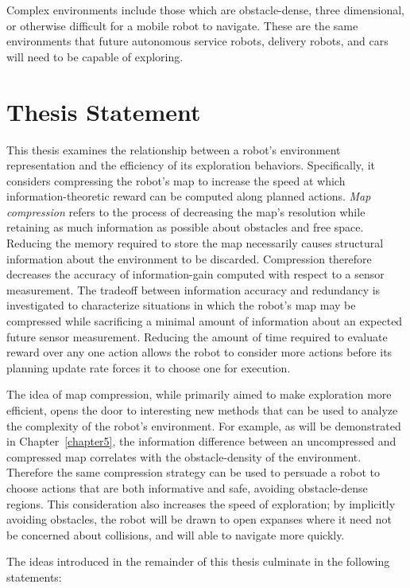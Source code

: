 Complex environments include those which are obstacle-dense, three dimensional, or
otherwise difficult for a mobile robot to navigate. These are the same
environments that future autonomous service robots, delivery robots, and cars
will need to be capable of exploring.

\section{Thesis Statement}

This thesis examines the relationship between a robot's environment
representation and the efficiency of its exploration behaviors.
Specifically, it considers compressing the robot's map to
increase the speed at which information-theoretic reward can be computed along
planned actions. \textit{Map compression} refers to the process of
decreasing the map's resolution while retaining as much information as
possible about obstacles and free space. Reducing the memory required to
store the map necessarily causes structural information about the environment to
be discarded. Compression therefore decreases the accuracy of information-gain
computed with respect to a sensor measurement. The tradeoff between information accuracy and
redundancy is investigated to characterize situations in which the robot's map may be
compressed while sacrificing a minimal amount of information about an expected
future sensor measurement. Reducing the amount of time required to evaluate
reward over any one action allows the robot to consider more actions before
its planning update rate forces it to choose one for execution.

The idea of map compression, while primarily aimed to make exploration more
efficient, opens the door to interesting new methods that can
be used to analyze the complexity of the robot's environment. For example,
as will be demonstrated in Chapter~\ref{chapter5},
the information difference between an uncompressed and
compressed map correlates with the obstacle-density of the environment.
Therefore the same compression strategy can be used to persuade a robot to
choose actions that are both informative and safe, avoiding obstacle-dense
regions. This consideration also increases the speed of exploration; by
implicitly avoiding obstacles, the robot will be drawn to open expanses where it
need not be concerned about collisions, and will able to navigate more quickly.

The ideas introduced in the remainder of this thesis culminate in the following
statements:

